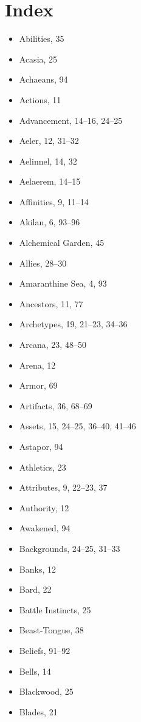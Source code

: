 
\chapter{Index}

\begin{multicols}{2}
\begin{itemize}
  \item Abilities, 35
  \item Acasia, 25
  \item Achaeans, 94
  \item Actions, 11
  \item Advancement, 14--16, 24--25
  \item Aeler, 12, 31--32
  \item Aelinnel, 14, 32
  \item Aelaerem, 14--15
  \item Affinities, 9, 11--14
  \item Akilan, 6, 93--96
  \item Alchemical Garden, 45
  \item Allies, 28--30
  \item Amaranthine Sea, 4, 93
  \item Ancestors, 11, 77
  \item Archetypes, 19, 21--23, 34--36
  \item Arcana, 23, 48--50
  \item Arena, 12
  \item Armor, 69
  \item Artifacts, 36, 68--69
  \item Assets, 15, 24--25, 36--40, 41--46
  \item Astapor, 94
  \item Athletics, 23
  \item Attributes, 9, 22--23, 37
  \item Authority, 12
  \item Awakened, 94
  \item Backgrounds, 24--25, 31--33
  \item Banks, 12
  \item Bard, 22
  \item Battle Instincts, 25
  \item Beast-Tongue, 38
  \item Beliefs, 91--92
  \item Bells, 14
  \item Blackwood, 25
  \item Blades, 21

\end{itemize}
\end{multicols}
